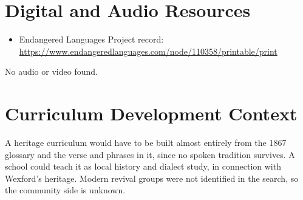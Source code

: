 \documentclass[12pt]{article}
\begin{document}
\section{Digital and Audio Resources}
\begin{itemize}
\item Endangered Languages Project record: \url{https://www.endangeredlanguages.com/node/110358/printable/print}
\end{itemize}
No audio or video found.

\section{Curriculum Development Context}
A heritage curriculum would have to be built almost entirely from the 1867 glossary and the verse and phrases in it, since no spoken tradition survives. A school could teach it as local history and dialect study, in connection with Wexford's heritage. Modern revival groups were not identified in the search, so the community side is unknown.
\end{document}
